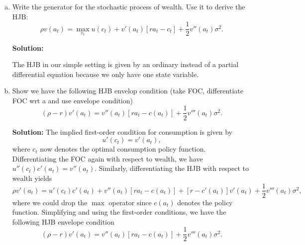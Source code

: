 \documentclass[11pt]{extarticle}
\theoremstyle{plain}
\theoremstyle{definition}
\begin{document}
\begin{enumerate}[(a)]

\item Write the generator for the stochastic process of wealth. Use it to derive the HJB:
\begin{equation}
	\rho v(a_t) = \max_{c_t} u(c_t) + v'(a_t) [ra_t - c_t] + \frac{1}{2} v''(a_t) \sigma^2.
\end{equation}

\textbf{Solution:}

The HJB in our simple setting is given by an ordinary instead of a partial differential equation because we only have one state variable. 
\item Show we have the following HJB envelop condition (take FOC, differentiate FOC wrt a and use envelope condition)
\begin{equation*}
	(\rho - r) v'(a_t) = v''(a_t) [ra_t - c(a_t)] + \frac{1}{2} v'''(a_t) \sigma^2.
\end{equation*}

\textbf{Solution:}
The implied first-order condition for consumption is given by
\begin{equation}
	u'(c_t) = v'(a_t),
\end{equation}
where $c_t$ now denotes the optimal consumption policy function. Differentiating the FOC again with respect to wealth, we have $u''(c_t) c'(a_t) = v''(a_t)$. Similarly, differentiating the HJB with respect to wealth yields 
\begin{equation*}
	\rho v'(a_t) = u'(c_t)c'(a_t) + v''(a_t) [ra_t - c(a_t)] + [r - c'(a_t)] v'(a_t) + \frac{1}{2} v'''(a_t) \sigma^2,
\end{equation*}
where we could drop the $\max$ operator since $c(a_t)$ denotes the policy function. Simplifying and using the first-order conditions, we have the following HJB envelope condition
\begin{equation*}
	(\rho - r) v'(a_t) = v''(a_t) [ra_t - c(a_t)] + \frac{1}{2} v'''(a_t) \sigma^2.
\end{equation*}


\end{enumerate}
\end{document}
